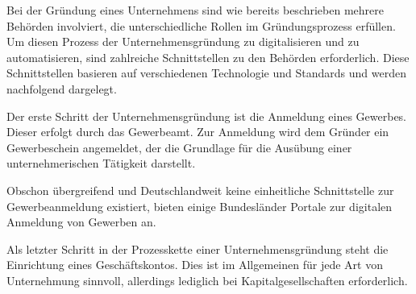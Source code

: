 
Bei der Gründung eines Unternehmens sind wie bereits beschrieben mehrere Behörden
involviert, die unterschiedliche Rollen im Gründungsprozess erfüllen.
Um diesen Prozess der Unternehmensgründung zu digitalisieren und zu automatisieren, sind zahlreiche Schnittstellen zu den Behörden erforderlich.
Diese Schnittstellen basieren auf verschiedenen Technologie und Standards und werden nachfolgend dargelegt.

Der erste Schritt der Unternehmensgründung ist die Anmeldung eines Gewerbes. Dieser erfolgt
durch das Gewerbeamt. Zur Anmeldung wird dem Gründer ein Gewerbeschein angemeldet, der die Grundlage
für die Ausübung einer unternehmerischen Tätigkeit darstellt.

Obschon übergreifend und Deutschlandweit keine einheitliche Schnittstelle zur Gewerbeanmeldung existiert, 
bieten einige Bundesländer Portale zur digitalen Anmeldung von Gewerben an. 

Als letzter Schritt in der Prozesskette einer Unternehmensgründung steht die Einrichtung eines Geschäftskontos. Dies ist im Allgemeinen
für jede Art von Unternehmung sinnvoll, allerdings lediglich bei Kapitalgesellschaften erforderlich.






